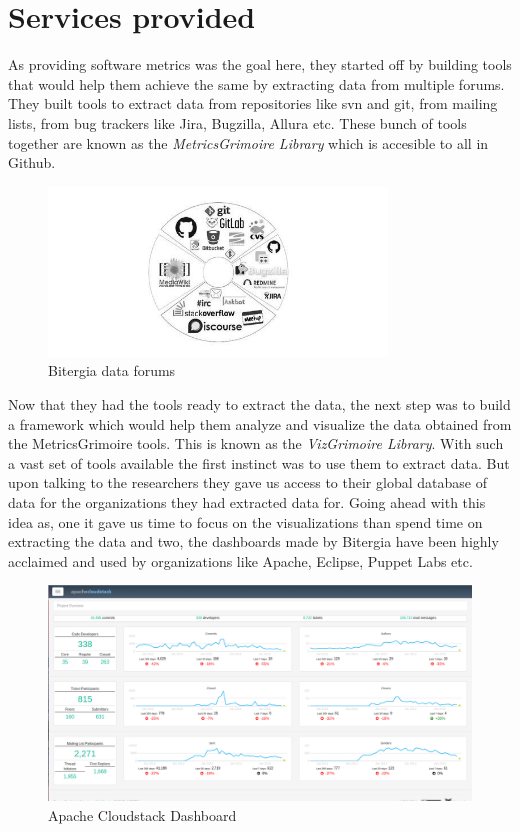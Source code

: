 \documentclass[seploa]{beavtex}
\begin{document}
\section{Services provided}
As providing software metrics was the goal here, they started off by building tools that would help them achieve the same by extracting data from multiple forums. They built tools to extract data from repositories like svn and git, from mailing lists, from bug trackers like Jira, Bugzilla, Allura etc. These bunch of tools together are known as the \emph{MetricsGrimoire Library} which is accesible to all in Github.

\begin{figure}[!ht]
\centering
\includegraphics[width=90mm]{bitergia.jpg}
\caption{Bitergia data forums}
\end{figure}

Now that they had the tools ready to extract the data, the next step was to build a framework which would help them analyze and visualize the data obtained from the MetricsGrimoire tools. This is known as the \emph{VizGrimoire Library}. With such a vast set of tools available the first instinct was to use them to extract data. But upon talking to the researchers they gave us access to their global database of data for the organizations they had extracted data for. Going ahead with this idea as, one it gave us time to focus on the visualizations than spend time on extracting the data and two, the dashboards made by Bitergia have been highly acclaimed and used by organizations like Apache, Eclipse, Puppet Labs etc.

\begin{figure}[H]
\centering
\includegraphics[width=120mm]{apache.png}
\caption{Apache Cloudstack Dashboard}
\end{figure}
\end{document}
